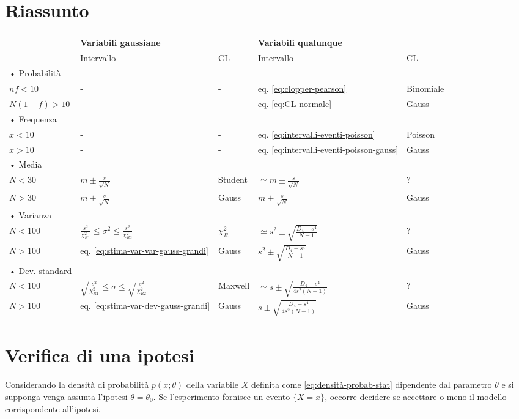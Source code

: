 \section{Riassunto} %
\label{sec:riassunto-stime}
\begin{tabularx}{\textwidth}{llllX}
\toprule
 & Variabili gaussiane & & Variabili qualunque \\
\toprule
 & Intervallo & CL & Intervallo & CL \\
\midrule
• Probabilità  &&&& \\
$nf<10$& - & - & eq. \ref{eq:clopper-pearson} & Binomiale \\
$N(1-f)>10$& - & - & eq. \ref{eq:CL-normale} & Gauss \\
• Frequenza &&&& \\
$x<10$& - & - & eq. \ref{eq:intervalli-eventi-poisson} & Poisson \\
$x>10$& - & - & eq. \ref{eq:intervalli-eventi-poisson-gauss} & Gauss \\
• Media &&&& \\
$N<30$& $m\pm\frac{s}{\sqrt{N}}$ & Student & $\simeq m \pm \frac{s}{\sqrt{N}}$ & ? \\
$N>30$& $m\pm\frac{s}{\sqrt{N}}$ & Gauss & $m \pm \frac{s}{\sqrt{N}}$ & Gauss \\
• Varianza &&&& \\
$N<100$& $\frac { s^{ 2 } }{ \chi ^{ 2 }_{ R1 } } \le \sigma ^{ 2 }\le \frac { s^{ 2 } }{ \chi ^{ 2 }_{ R2 } } $ & $\chi^2_R$ & $\simeq { s }^{ 2 }\pm \sqrt { \frac { D_{ 4 }-s^{ 4 } }{ N-1 }  }$ & ? \\
$N>100$& eq. \ref{eq:stima-var-var-gauss-grandi} & Gauss & ${ s }^{ 2 }\pm \sqrt { \frac { D_{ 4 }-s^{ 4 } }{ N-1 }  } $ & Gauss \\
• Dev. standard &&&& \\
$N<100$& $\sqrt { \frac { s^{ 2 } }{ \chi ^{ 2 }_{ R1 } }  } \le \sigma \le \sqrt { \frac { s^{ 2 } }{ \chi ^{ 2 }_{ R2 } }  } $ & Maxwell & $\simeq { s }\pm \sqrt { \frac { D_{ 4 }-s^{ 4 } }{ 4{ s }^{ 2 }\left( N-1 \right)  }  } $  & ? \\
$N>100$& eq. \ref{eq:stima-var-dev-gauss-grandi} & Gauss & $ { s }\pm \sqrt { \frac { D_{ 4 }-s^{ 4 } }{ 4{ s }^{ 2 }\left( N-1 \right)  }  } $ & Gauss \\
\end{tabularx}

\section{Verifica di una ipotesi} %
\label{sec:test-ipotesi}
Considerando la densità di probabilità $p\left( x;\theta  \right) $ della variabile $X$ definita come \ref{eq:densità-probab-stat} dipendente dal parametro $\theta$ e si supponga venga assunta l'ipotesi $\theta=\theta_0$. Se l'esperimento fornisce un evento $\{X=x\}$, occorre decidere se accettare o meno il modello corrispondente all'ipotesi.

